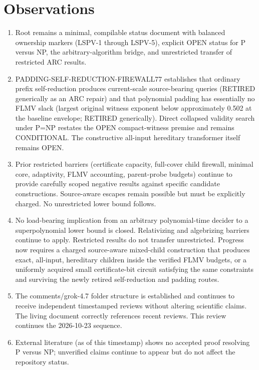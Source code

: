 \documentclass[11pt]{article}
\begin{document}
\section{Observations}
\begin{enumerate}
\item Root  remains a minimal, compilable status document with balanced ownership markers (LSPV-1 through LSPV-5), explicit OPEN status for P versus NP, the arbitrary-algorithm bridge, and unrestricted transfer of restricted ARC results.
\item PADDING-SELF-REDUCTION-FIREWALL77 establishes that ordinary prefix self-reduction produces current-scale source-bearing queries (RETIRED generically as an ARC repair) and that polynomial padding has essentially no FLMV slack (largest original witness exponent below approximately 0.502 at the baseline envelope; RETIRED generically). Direct collapsed validity search under P=NP restates the OPEN compact-witness premise and remains CONDITIONAL. The constructive all-input hereditary transformer itself remains OPEN.
\item Prior restricted barriers (certificate capacity, full-cover child firewall, minimal core, adaptivity, FLMV accounting, parent-probe budgets) continue to provide carefully scoped negative results against specific candidate constructions. Source-aware escapes remain possible but must be explicitly charged. No unrestricted lower bound follows.
\item No load-bearing implication from an arbitrary polynomial-time decider to a superpolynomial lower bound is closed. Relativizing and algebrizing barriers continue to apply. Restricted results do not transfer unrestricted. Progress now requires a charged source-aware mixed-child construction that produces exact, all-input, hereditary children inside the verified FLMV budgets, or a uniformly acquired small certificate-bit circuit satisfying the same constraints and surviving the newly retired self-reduction and padding routes.
\item The comments/grok-4.7 folder structure is established and continues to receive independent timestamped reviews without altering scientific claims. The living document correctly references recent reviews. This review continues the 2026-10-23 sequence.
\item External literature (as of this timestamp) shows no accepted proof resolving P versus NP; unverified claims continue to appear but do not affect the repository status.
\end{enumerate}
\end{document}
